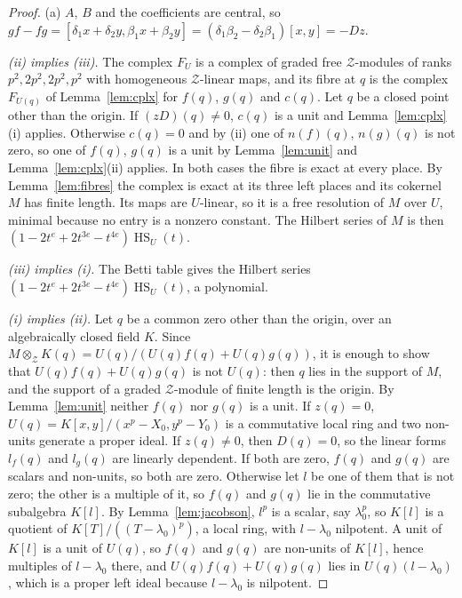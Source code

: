 \documentclass[11pt]{article}
\theoremstyle{definition}
\theoremstyle{remark}
\newcommand{\Hilb}{\operatorname{HS}}
\begin{document}
\begin{proof}
(a) $A$, $B$ and the coefficients are central, so $gf-fg=[\delta_1x+\delta_2y,\beta_1x+\beta_2y]=(\delta_1\beta_2-\delta_2\beta_1)[x,y]=-Dz$.

\emph{(ii) implies (iii).} The complex $F_U$ is a complex of graded free $\mathcal Z$-modules of ranks $p^2,2p^2,2p^2,p^2$ with homogeneous $\mathcal Z$-linear maps, and its fibre at $q$ is the complex $F_{U(q)}$ of Lemma~\ref{lem:cplx} for $f(q)$, $g(q)$ and $c(q)$. Let $q$ be a closed point other than the origin. If $(zD)(q)\ne0$, $c(q)$ is a unit and Lemma~\ref{lem:cplx}(i) applies. Otherwise $c(q)=0$ and by (ii) one of $n(f)(q)$, $n(g)(q)$ is not zero, so one of $f(q)$, $g(q)$ is a unit by Lemma~\ref{lem:unit} and Lemma~\ref{lem:cplx}(ii) applies. In both cases the fibre is exact at every place. By Lemma~\ref{lem:fibres} the complex is exact at its three left places and its cokernel $M$ has finite length. Its maps are $U$-linear, so it is a free resolution of $M$ over $U$, minimal because no entry is a nonzero constant. The Hilbert series of $M$ is then $(1-2t^e+2t^{3e}-t^{4e})\Hilb_U(t)$.

\emph{(iii) implies (i).} The Betti table gives the Hilbert series $(1-2t^e+2t^{3e}-t^{4e})\Hilb_U(t)$, a polynomial.

\emph{(i) implies (ii).} Let $q$ be a common zero other than the origin, over an algebraically closed field $K$. Since $M\otimes_{\mathcal Z}K(q)=U(q)/(U(q)f(q)+U(q)g(q))$, it is enough to show that $U(q)f(q)+U(q)g(q)$ is not $U(q)$: then $q$ lies in the support of $M$, and the support of a graded $\mathcal Z$-module of finite length is the origin. By Lemma~\ref{lem:unit} neither $f(q)$ nor $g(q)$ is a unit. If $z(q)=0$, $U(q)=K[x,y]/(x^p-X_0,y^p-Y_0)$ is a commutative local ring and two non-units generate a proper ideal. If $z(q)\ne0$, then $D(q)=0$, so the linear forms $l_f(q)$ and $l_g(q)$ are linearly dependent. If both are zero, $f(q)$ and $g(q)$ are scalars and non-units, so both are zero. Otherwise let $l$ be one of them that is not zero; the other is a multiple of it, so $f(q)$ and $g(q)$ lie in the commutative subalgebra $K[l]$. By Lemma~\ref{lem:jacobson}, $l^p$ is a scalar, say $\lambda_0^p$, so $K[l]$ is a quotient of $K[T]/((T-\lambda_0)^p)$, a local ring, with $l-\lambda_0$ nilpotent. A unit of $K[l]$ is a unit of $U(q)$, so $f(q)$ and $g(q)$ are non-units of $K[l]$, hence multiples of $l-\lambda_0$ there, and $U(q)f(q)+U(q)g(q)$ lies in $U(q)(l-\lambda_0)$, which is a proper left ideal because $l-\lambda_0$ is nilpotent.
\end{proof}
\end{document}
